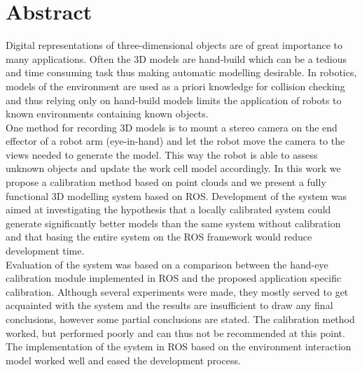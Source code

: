 \chapter*{Abstract}
Digital representations of three-dimensional objects are of great importance to many applications. Often the 3D models are hand-build which can be a tedious and time consuming task thus making automatic modelling desirable. In robotics, models of the environment are used as a priori knowledge for collision checking and thus relying only on hand-build models limits the application of robots to known environments containing known objects. \\

One method for recording 3D models is to mount a stereo camera on the end effector of a robot arm (eye-in-hand) and let the robot move the camera to the views needed to generate the model. This way the robot is able to assess unknown objects and update the work cell model accordingly. In this work we propose a calibration method based on point clouds and we present a fully functional 3D modelling system based on ROS. Development of the system was aimed at investigating the hypothesis that a locally calibrated system could generate significantly better models than the same system without calibration and that basing the entire system on the ROS framework would reduce development time. \\

Evaluation of the system was based on a comparison between the hand-eye calibration module implemented in ROS and the proposed application specific calibration. Although several experiments were made, they mostly served to get acquainted with the system and the results are insufficient to draw any final conclusions, however some partial conclusions are stated. The calibration method worked, but performed poorly and can thus not be recommended at this point. The implementation of the system in ROS based on the environment interaction model worked well and eased the development process. \\